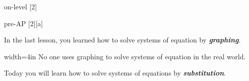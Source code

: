 



\renewcommand{\thechapter}{4} 
\renewcommand{\myCurrentChapterTitle}{Systems of Equations}

\begin{taggedblock}{on-level}
    [2]
\end{taggedblock}
\begin{taggedblock}{pre-AP}
    [2][a]
\end{taggedblock}

\begin{myObjectives}
\end{myObjectives}

\begin{myVocabulary}
\end{myVocabulary}

In the last lesson,
you learned how to solve systems of equation by {\bfseries\itshape graphing}.

\begin{myCenteredBox}{width=4in}
    No one uses graphing
    to solve systems of equation 
    in the real world.
\end{myCenteredBox}

\noindent
Today you will learn how to solve systems of equations by {\bfseries\itshape substitution}.




